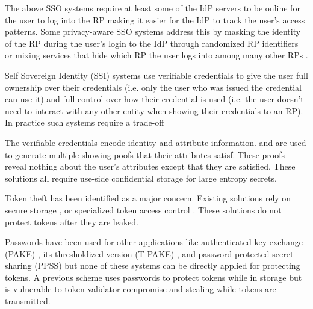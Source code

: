 \documentclass[conference]{IEEEtran}
\def\blue{\color{blue}}
\def\blue{\color{blue}}
\begin{document}
The above SSO systems require at least some of the IdP servers to be online for the user to log into the RP making it easier for the IdP to track the user's access patterns. Some privacy-aware SSO systems address this by masking the identity of the RP during the user's login to the IdP through randomized RP identifiers \cite{10.1145/3605760.3623767,10.1145/3320269.3384724,guo2022uppresso} or mixing services that hide which RP the user logs into among many other RPs \cite{10190538}. 


Self Sovereign Identity (SSI) systems use verifiable credentials to give the user full ownership over their credentials (i.e. only the user who was issued the credential can use it) and full control over how their credential is used (i.e. the user doesn't need to interact with any other entity when showing their credentials to an RP). In practice such systems require a trade-off   

The verifiable credentials encode identity and attribute information.  and are used to generate multiple showing poofs that their attributes satisf. These proofs reveal nothing about the user's attributes except that they are satisfied. These solutions all require use-side confidential storage for large entropy secrets.     

Token theft has been identified as a major concern. Existing solutions rely on secure storage \cite{10.1007/978-3-642-19125-1_7}\cite{10.1145/1367497.1367568}, or specialized token access control \cite{10.3233/JCS-150529}. These solutions do not protect tokens after they are leaked. 

Passwords have been used for other applications like authenticated key exchange (PAKE) \cite{bellovin}, its thresholdized version (T-PAKE) \cite{T-PAKE-Mackenzie,di2003provably}, and password-protected secret sharing (PPSS) 
\cite{PPSS-bagherzand,jarecki2014round} but none of these systems can be directly applied for protecting tokens. A previous scheme \cite{5670871} uses passwords to protect tokens while in storage but is vulnerable to token validator compromise and stealing while tokens are transmitted. 
\end{document}
